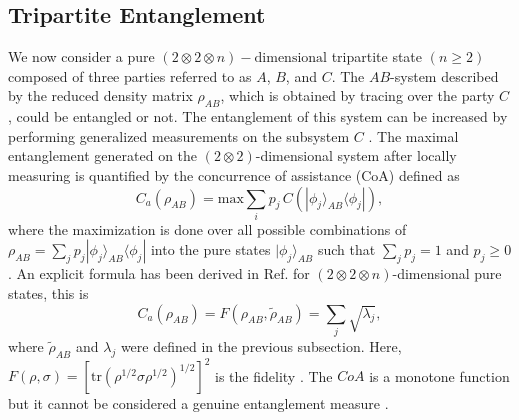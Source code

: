 \subsection{\label{sec:formalism1b}Tripartite Entanglement}

We now consider a pure $(2 \otimes 2 \otimes n)-\text{dimensional}$ tripartite state $(n \geq 2)$ composed of three parties referred to as $A$, $B$, and $C$. The $AB$-system described by the reduced density matrix $\rho_{AB}$, which is obtained by tracing over the party $C$, could be entangled or not. The entanglement of this system can be increased by performing generalized measurements on the subsystem $C$ \cite{nielsen2000chuang}. The maximal entanglement generated on the  $(2 \otimes 2)$-dimensional system after locally measuring is quantified by the concurrence of assistance (CoA) \cite{williams1999quantum, gour2005deterministic} defined as
\begin{equation}\label{coa_1}
C_{a}\left(\rho_{AB}\right)=\textrm{max}\sum_{i}p_{j}\,C\left(|\phi_{j}\rangle_{AB} \langle \phi_{j}|\right),
\end{equation}
where the maximization is done over all possible combinations of $\rho_{AB}=\sum_{j}p_{j}|\phi_{j}\rangle_{AB}\langle \phi_{j}|$ into the pure states $|\phi_{j}\rangle_{AB}$ such that $\sum_{j}p_{j}=1$ and $p_{j}\geq 0$ \cite{hughston1993complete}. An explicit formula has been derived in Ref. \cite{10.5555/2011508.2011514} for $(2 \otimes 2 \otimes n)$-dimensional pure states, this is 
\begin{equation}\label{coa_2}
C_{a}\left(\rho_{AB}\right)=F\left(\rho_{AB}, \tilde\rho_{AB}\right)=\sum_{j}\sqrt{\lambda_{j}},
\end{equation}
where $\tilde\rho_{AB}$ and $\lambda_{j}$ were defined in the previous subsection. Here, $F\left(\rho,\sigma\right)=\left[\textrm{tr}\left(\rho^{1/2}\sigma\rho^{1/2}\right)^{1/2}\right]^{2}$ is the fidelity \cite{jozsa1994fidelity}. The $CoA$ is a monotone function but it cannot be considered a genuine entanglement measure \cite{gour2005family}. 

